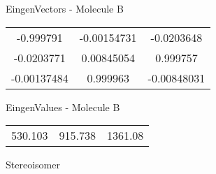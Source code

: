\begin{multicols}{2}
\begin{center}
\vtab
 EingenVectors - Molecule B     \\
\vtab
\begin{tabular}{|c c c|}
-0.999791	 & 	-0.00154731	 & 	-0.0203648	 \\
-0.0203771	 & 	0.00845054	 & 	0.999757	 \\
-0.00137484	 & 	0.999963	 & 	-0.00848031
\end{tabular}

\vtab
 EingenValues - Molecule B     \\
\vtab
\begin{tabular}{|c c c|}
530.103	 & 	915.738	 & 	1361.08	 \\
\end{tabular}

\end{center}
\end{multicols}
\begin{center}
\vtab
\vtab
\textcolor{NavyBlue}{\Large Stereoisomer}
\end{center}

 \newpage


